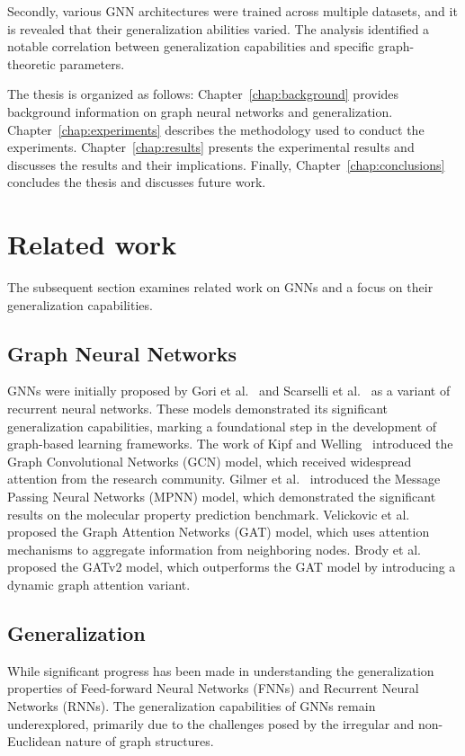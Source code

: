 Secondly, various GNN architectures were trained across multiple datasets, and it is revealed that their generalization abilities varied. The analysis identified a notable correlation between generalization capabilities and specific graph-theoretic parameters.

The thesis is organized as follows:
Chapter~\ref{chap:background} provides background information on graph neural networks and generalization. Chapter~\ref{chap:experiments} describes the methodology used to conduct the experiments. Chapter~\ref{chap:results} presents the experimental results and discusses the results and their implications. Finally, Chapter~\ref{chap:conclusions} concludes the thesis and discusses future work.

\section{Related work}
The subsequent section examines related work on GNNs and a focus on their generalization capabilities.

\subsection{Graph Neural Networks}
GNNs were initially proposed by Gori et al.~\cite{gori2005new} and Scarselli et al.~\cite{scarselli2008graph} as a variant of recurrent neural networks. These models demonstrated its significant generalization capabilities, marking a foundational step in the development of graph-based learning frameworks. The work of Kipf and Welling~\cite{kipf2016semi} introduced the Graph Convolutional Networks (GCN) model, which received widespread attention from the research community. Gilmer et al.~\cite{gilmer2017neural} introduced the Message Passing Neural Networks (MPNN) model, which demonstrated the significant results on the molecular property prediction benchmark. Velickovic et al.~\cite{velivckovic2017graph} proposed the Graph Attention Networks (GAT) model, which uses attention mechanisms to aggregate information from neighboring nodes. Brody et al.~\cite{brody2021attentive} proposed the GATv2 model, which outperforms the GAT model by introducing a dynamic graph attention variant.

\subsection{Generalization}
While significant progress has been made in understanding the generalization properties of Feed-forward Neural Networks (FNNs) and Recurrent Neural Networks (RNNs). The generalization capabilities of GNNs remain underexplored, primarily due to the challenges posed by the irregular and non-Euclidean nature of graph structures.

